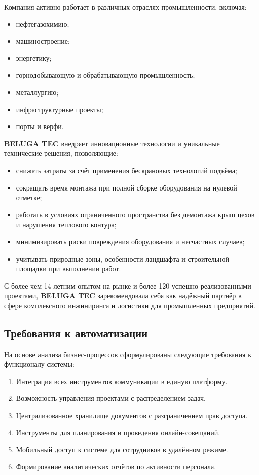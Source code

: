 Компания активно работает в различных отраслях промышленности, включая:

\begin{itemize}
  \item нефтегазохимию;
  \item машиностроение;
  \item энергетику;
  \item горнодобывающую и обрабатывающую промышленность;
  \item металлургию;
  \item инфраструктурные проекты;
  \item порты и верфи.
\end{itemize}

\textbf{BELUGA TEC} внедряет инновационные технологии и уникальные технические решения, позволяющие:

\begin{itemize}
  \item снижать затраты за счёт применения бескрановых технологий подъёма;
  \item сокращать время монтажа при полной сборке оборудования на нулевой отметке;
  \item работать в условиях ограниченного пространства без демонтажа крыш цехов и нарушения теплового контура;
  \item минимизировать риски повреждения оборудования и несчастных случаев;
  \item учитывать природные зоны, особенности ландшафта и строительной площадки при выполнении работ.
\end{itemize}

С более чем 14-летним опытом на рынке и более 120 успешно реализованными проектами, \textbf{BELUGA TEC} зарекомендовала себя как надёжный партнёр в сфере комплексного инжиниринга и логистики для промышленных предприятий.

\subsection{Требования к автоматизации}

На основе анализа бизнес-процессов сформулированы следующие требования к функционалу системы:

\begin{enumerate}
  \item Интеграция всех инструментов коммуникации в единую платформу.
  \item Возможность управления проектами с распределением задач.
  \item Централизованное хранилище документов с разграничением прав доступа.
  \item Инструменты для планирования и проведения онлайн-совещаний.
  \item Мобильный доступ к системе для сотрудников в удалённом режиме.
  \item Формирование аналитических отчётов по активности персонала.
\end{enumerate}


